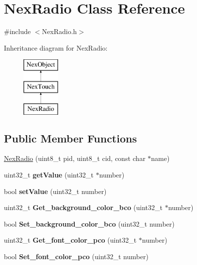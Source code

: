 \hypertarget{class_nex_radio}{\section{Nex\+Radio Class Reference}
\label{class_nex_radio}
}


{\ttfamily \#include $<$Nex\+Radio.\+h$>$}

Inheritance diagram for Nex\+Radio\+:\begin{figure}[H]
\begin{center}
\leavevmode
\includegraphics[height=3.000000cm]{class_nex_radio}
\end{center}
\end{figure}
\subsection*{Public Member Functions}
\begin{DoxyCompactItemize}
\item 
\hyperlink{class_nex_radio_a52264cd95aaa3ba7b4b07bdf64bb7a65}{Nex\+Radio} (uint8\+\_\+t pid, uint8\+\_\+t cid, const char $\ast$name)
\item 
\hypertarget{class_nex_radio_adb3672f10ce98ec7ad22f7b29a9ec0e6}{uint32\+\_\+t {\bfseries get\+Value} (uint32\+\_\+t $\ast$number)}\label{class_nex_radio_adb3672f10ce98ec7ad22f7b29a9ec0e6}

\item 
\hypertarget{class_nex_radio_aa92d6f41ff30467a965e8a802e7d8b83}{bool {\bfseries set\+Value} (uint32\+\_\+t number)}\label{class_nex_radio_aa92d6f41ff30467a965e8a802e7d8b83}

\item 
\hypertarget{class_nex_radio_abdc8f654237d900eb3ddc955bc9e0038}{uint32\+\_\+t {\bfseries Get\+\_\+background\+\_\+color\+\_\+bco} (uint32\+\_\+t $\ast$number)}\label{class_nex_radio_abdc8f654237d900eb3ddc955bc9e0038}

\item 
\hypertarget{class_nex_radio_a7bbd252dc78876d0831badbe791dbbc8}{bool {\bfseries Set\+\_\+background\+\_\+color\+\_\+bco} (uint32\+\_\+t number)}\label{class_nex_radio_a7bbd252dc78876d0831badbe791dbbc8}

\item 
\hypertarget{class_nex_radio_a7a052fb745dfea5fe6f341692eb0ca1a}{uint32\+\_\+t {\bfseries Get\+\_\+font\+\_\+color\+\_\+pco} (uint32\+\_\+t $\ast$number)}\label{class_nex_radio_a7a052fb745dfea5fe6f341692eb0ca1a}

\item 
\hypertarget{class_nex_radio_afd379837becbcf4a8f126820658a7f78}{bool {\bfseries Set\+\_\+font\+\_\+color\+\_\+pco} (uint32\+\_\+t number)}\label{class_nex_radio_afd379837becbcf4a8f126820658a7f78}

\end{DoxyCompactItemize}
